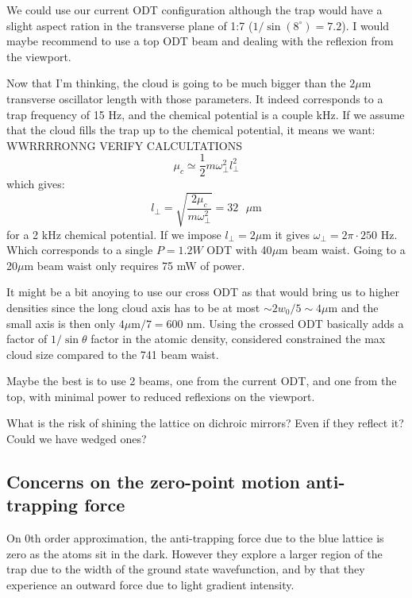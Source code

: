 \documentclass[reprint,amsmath,amssymb,aps,nofootinbib]{revtex4-1}
\begin{document}
We could use our current ODT configuration although the trap would have a slight aspect ration in the transverse plane of 1:7 ($1/\sin(8^{\circ}) = 7.2$). I would maybe recommend to use a top ODT beam and dealing with the reflexion from the viewport.

Now that I'm thinking, the cloud is going to be much bigger than the $2\mu$m transverse oscillator length with those parameters. It indeed corresponds to a trap frequency of 15 Hz, and the chemical potential is a couple kHz. If we assume that the cloud fills the trap up to the chemical potential, it means we want: WWRRRRONNG VERIFY CALCULTATIONS
\begin{equation}
\mu_{c} \simeq \frac{1}{2}m\omega_{\perp}^{2}l_{\perp}^{2}
\end{equation}
which gives:
\begin{equation}
l_{\perp} = \sqrt{\frac{2\mu_{c}}{m\omega_{\perp}^{2}}} = 32\text{ $\mu$m}
\end{equation}
for a 2 kHz chemical potential. If we impose $l_{\perp} = 2\mu$m it gives $\omega_{\perp} = 2\pi\cdot 250$ Hz. Which corresponds to a single $P=1.2W$ ODT with 40$\mu$m beam waist. Going to a 20$\mu$m beam waist only requires 75 mW of power.

It might be a bit anoying to use our cross ODT as that would bring us to higher densities since the long cloud axis has to be at most $\sim 2w_{0}/5 \sim 4\mu$m and the small axis is then only $4\mu\text{m}/7= 600$ nm. Using the crossed ODT basically adds a factor of $1/\sin\theta$ factor in the atomic density, considered constrained the max cloud size compared to the 741 beam waist.

Maybe the best is to use 2 beams, one from the current ODT, and one from the top, with minimal power to reduced reflexions on the viewport.

What is the risk of shining the lattice on dichroic mirrors? Even if they reflect it? Could we have wedged ones?

\subsection{Concerns on the zero-point motion anti-trapping force}

On 0th order approximation, the anti-trapping force due to the blue lattice is zero as the atoms sit in the dark. However they explore a larger region of the trap due to the width of the ground state wavefunction, and by that they experience an outward force due to light gradient intensity.
\end{document}
